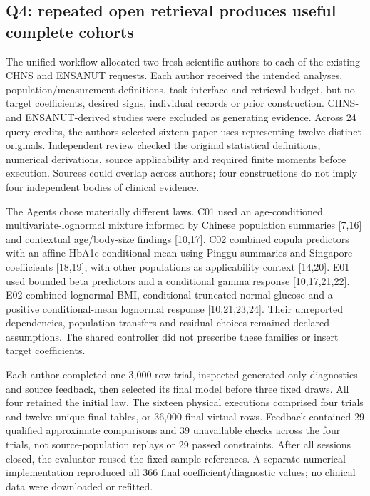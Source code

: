 \documentclass[10pt,twocolumn]{article}
\begin{document}
\subsection{Q4: repeated open retrieval produces useful complete cohorts}

The unified workflow allocated two fresh scientific authors to each of the existing CHNS and ENSANUT requests. Each author received the intended analyses, population/measurement definitions, task interface and retrieval budget, but no target coefficients, desired signs, individual records or prior construction. CHNS- and ENSANUT-derived studies were excluded as generating evidence. Across 24 query credits, the authors selected sixteen paper uses representing twelve distinct originals. Independent review checked the original statistical definitions, numerical derivations, source applicability and required finite moments before execution. Sources could overlap across authors; four constructions do not imply four independent bodies of clinical evidence.


The Agents chose materially different laws. C01 used an age-conditioned multivariate-lognormal mixture informed by Chinese population summaries [7,16] and contextual age/body-size findings [10,17]. C02 combined copula predictors with an affine HbA1c conditional mean using Pinggu summaries and Singapore coefficients [18,19], with other populations as applicability context [14,20]. E01 used bounded beta predictors and a conditional gamma response [10,17,21,22]. E02 combined lognormal BMI, conditional truncated-normal glucose and a positive conditional-mean lognormal response [10,21,23,24]. Their unreported dependencies, population transfers and residual choices remained declared assumptions. The shared controller did not prescribe these families or insert target coefficients.


Each author completed one 3,000-row trial, inspected generated-only diagnostics and source feedback, then selected its final model before three fixed draws. All four retained the initial law. The sixteen physical executions comprised four trials and twelve unique final tables, or 36,000 final virtual rows. Feedback contained 29 qualified approximate comparisons and 39 unavailable checks across the four trials, not source-population replays or 29 passed constraints. After all sessions closed, the evaluator reused the fixed sample references. A separate numerical implementation reproduced all 366 final coefficient/diagnostic values; no clinical data were downloaded or refitted.
\end{document}
